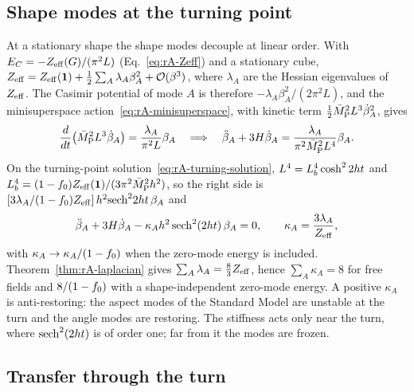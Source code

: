 \subsection{Shape modes at the turning point}
\label{rA:sh-modes}

At a stationary shape the shape modes decouple at linear order.
With $E_C=-Z_{\rm eff}(G)/(\pi^2L)$ (Eq.~\eqref{eq:rA-Zeff}) and a stationary cube, $Z_{\rm eff}=Z_{\rm eff}(\mathbf{1})+\tfrac12\sum_A\lambda_A\beta_A^2+\mathcal O(\beta^3)$, where $\lambda_A$ are the Hessian eigenvalues of $Z_{\rm eff}$.
The Casimir potential of mode $A$ is therefore $-\lambda_A\beta_A^2/(2\pi^2L)$, and the minisuperspace action~\eqref{eq:rA-minisuperspace}, with kinetic term $\tfrac12\bar M_{\mathrm{P}}^2L^3\dot\beta_A^2$, gives
\begin{equation}
\frac{d}{dt}\big(\bar M_{\mathrm{P}}^2L^3\dot\beta_A\big)=\frac{\lambda_A}{\pi^2L}\beta_A
\quad\Longrightarrow\quad
\ddot\beta_A+3H\dot\beta_A=\frac{\lambda_A}{\pi^2\bar M_{\mathrm{P}}^2L^4}\beta_A .
\end{equation}
On the turning-point solution~\eqref{eq:rA-turning-solution}, $L^4=L_b^4\cosh^22ht$ and $L_b^4=(1-f_0)Z_{\rm eff}(\mathbf{1})/(3\pi^2\bar M_{\mathrm{P}}^2h^2)$, so the right side is $[3\lambda_A/(1-f_0)Z_{\rm eff}]\,h^2{\rm sech}^22ht\,\beta_A$ and
\begin{equation}
\ddot\beta_A+3H\dot\beta_A-\kappa_Ah^2\,{\rm sech}^2(2ht)\,\beta_A=0,\qquad \kappa_A=\frac{3\lambda_A}{Z_{\rm eff}},
\label{eq:rA-shapeode}
\end{equation}
with $\kappa_A\to\kappa_A/(1-f_0)$ when the zero-mode energy is included.
Theorem~\ref{thm:rA-laplacian} gives $\sum_A\lambda_A=\tfrac83Z_{\rm eff}$, hence $\sum_A\kappa_A=8$ for free fields and $8/(1-f_0)$ with a shape-independent zero-mode energy.
A positive $\kappa_A$ is anti-restoring: the aspect modes of the Standard Model are unstable at the turn and the angle modes are restoring.
The stiffness acts only near the turn, where ${\rm sech}^2(2ht)$ is of order one; far from it the modes are frozen.

\subsection{Transfer through the turn}
\label{rA:sh-transfer}

